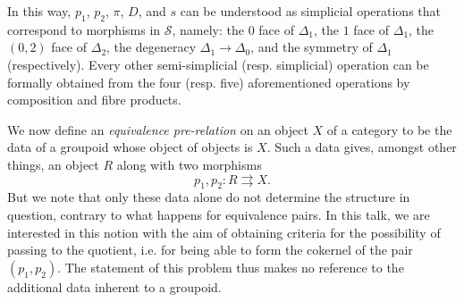   In this way, \(p_1\), \(p_2\), \(\pi \), \(D\), and \(s\) can be understood as simplicial operations that correspond to morphisms in \(\mathcal {S}\), namely: the \(0\) face of \(\Delta _1\), the \(1\) face of \(\Delta _1\), the \((0,2)\) face of \(\Delta _2\), the degeneracy \(\Delta _1\to \Delta _0\), and the symmetry of \(\Delta _1\) (respectively).
  Every other semi-simplicial (resp. simplicial) operation can be formally obtained from the four (resp. five) aforementioned operations by composition and fibre products.\par{}We now define an \emph{equivalence pre-relation} on an object \(X\) of a category to be the data of a groupoid whose object of objects is \(X\).
  Such a data gives, amongst other things, an object \(R\) along with two morphisms
  \[     p_1,p_2\colon  R\rightrightarrows  X.   \]
  But we note that only these data alone do not determine the structure in question, contrary to what happens for equivalence pairs.
  In this talk, we are interested in this notion with the aim of obtaining criteria for the possibility of passing to the quotient, i.e. for being able to form the cokernel of the pair \((p_1,p_2)\).
  The statement of this problem thus makes no reference to the additional data inherent to a groupoid.
  
